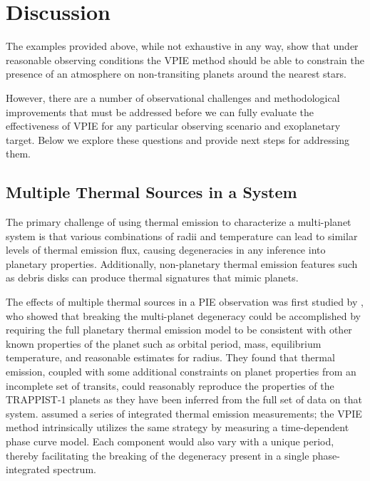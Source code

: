 \documentclass[twocolumn,linenumbers]{aastex7}
\begin{document}
\section{Discussion}
\label{sec:disc}
The examples provided above, while not exhaustive in any way, show that under reasonable observing conditions the VPIE method should be able to constrain the presence of an atmosphere on non-transiting planets around the nearest stars.

However, there are a number of observational challenges and methodological improvements that must be addressed before we can fully evaluate the effectiveness of VPIE for any particular observing scenario and exoplanetary target.  Below we explore these questions and provide next steps for addressing them.

\subsection{Multiple Thermal Sources in a System}
The primary challenge of using thermal emission to characterize a multi-planet system is that various combinations of radii and temperature can lead to similar levels of thermal emission flux, causing degeneracies in any inference into planetary properties. Additionally, non-planetary thermal emission features such as debris disks can produce thermal signatures that mimic planets.

The effects of multiple thermal sources in a PIE observation was first studied by \citet{mayorga2023}, who showed that breaking the multi-planet degeneracy could be accomplished by requiring the full planetary thermal emission model to be consistent with other known properties of the planet such as orbital period, mass, equilibrium temperature, and reasonable estimates for radius.  They found that thermal emission, coupled with some additional constraints on planet properties from an incomplete set of transits, could reasonably reproduce the properties of the TRAPPIST-1 planets as they have been inferred from the full set of data on that system. \citet{mayorga2023} assumed a series of integrated thermal emission measurements; the VPIE method intrinsically utilizes the same strategy by measuring a time-dependent phase curve model. Each component would also vary with a unique period, thereby facilitating the breaking of the degeneracy present in a single phase-integrated spectrum.
\end{document}
